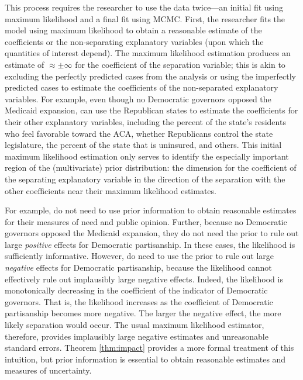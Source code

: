 \documentclass[12pt]{article}
\begin{document}
This process requires the researcher to use the data twice---an initial fit using maximum likelihood and a final fit using MCMC. 
First, the researcher fits the model using maximum likelihood to obtain a reasonable estimate of the coefficients or the non-separating explanatory variables (upon which the quantities of interest depend). 
The maximum likelihood estimation produces an estimate of $\approx \pm \infty$ for the coefficient of the separation variable; this is akin to excluding the perfectly predicted cases from the analysis or using the imperfectly predicted cases to estimate the coefficients of the non-separated explanatory variables.  
For example, even though no Democratic governors opposed the Medicaid expansion, \cite{BarrilleauxRainey2014} can use the Republican states to estimate the coefficients for their other explanatory variables, including the percent of the state's residents who feel favorable toward the ACA, whether Republicans control the state legislature, the percent of the state that is uninsured, and others.
This initial maximum likelihood estimation only serves to identify the especially important region of the (multivariate) prior distribution: the dimension for the coefficient of the separating explanatory variable in the direction of the separation with the other coefficients near their maximum likelihood estimates.

For example, \cite{BarrilleauxRainey2014} do not need to use prior information to obtain reasonable estimates for their measures of need and public opinion. 
Further, because no Democratic governors opposed the Medicaid expansion, they do not need the prior to rule out large \textit{positive} effects for Democratic partisanship. 
In these cases, the likelihood is sufficiently informative. However, \cite{BarrilleauxRainey2014} do need to use the prior to rule out large \textit{negative} effects for Democratic partisanship, because the likelihood cannot effectively rule out implausibly large negative effects. 
Indeed, the likelihood is monotonically decreasing in the coefficient of the indicator of Democratic governors. 
That is, the likelihood increases as the coefficient of Democratic partisanship becomes more negative. 
The larger the negative effect, the more likely separation would occur. 
The usual maximum likelihood estimator, therefore, provides implausibly large negative estimates and unreasonable standard errors. 
Theorem \ref{thm:impact} provides a more formal treatment of this intuition, but prior information is essential to obtain reasonable estimates and measures of uncertainty. 
\end{document}
